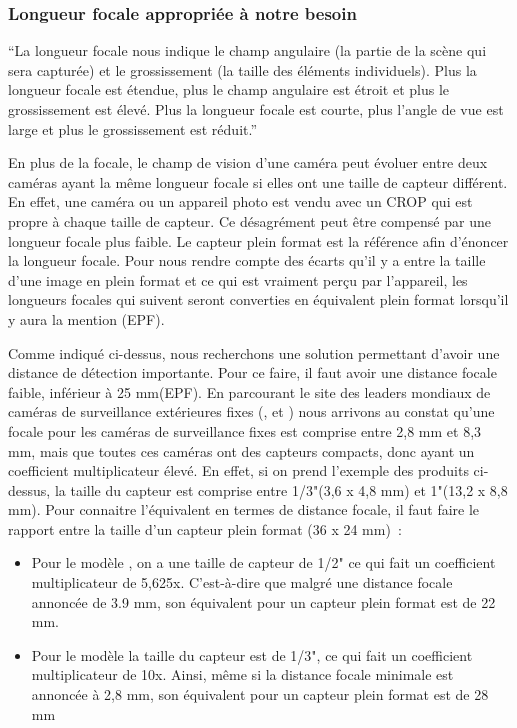 \subsubsection{Longueur focale appropriée à notre besoin}
\label{sec:camera_focale}

\enquote{La longueur focale nous indique le champ angulaire (la partie de la scène qui sera capturée)
    et le grossissement (la taille des éléments individuels).
    Plus la longueur focale est étendue, plus le champ angulaire est étroit et plus le grossissement est élevé.
    Plus la longueur focale est courte, plus l’angle de vue est large et plus le grossissement est réduit.} \cite{focale}

En plus de la focale, le champ de vision d'une caméra peut évoluer entre deux caméras ayant la même longueur focale
si elles ont une taille de capteur différent.
En effet, une caméra ou un appareil photo est vendu avec un \gls{CROP} qui est propre à chaque taille de capteur.
Ce désagrément peut être compensé par une longueur focale plus faible.
Le capteur plein format est la référence afin d'énoncer la longueur focale.
Pour nous rendre compte des écarts qu'il y a entre la taille d'une image en plein format et ce qui est vraiment perçu par l'appareil,
les longueurs focales qui suivent seront converties en équivalent plein format lorsqu'il y aura la mention (EPF).

Comme indiqué ci-dessus, nous recherchons une solution permettant d'avoir une distance de détection importante.
Pour ce faire, il faut avoir une distance focale faible, inférieur à 25 mm(EPF).
En parcourant le site des leaders mondiaux de caméras de surveillance extérieures fixes
(\cite[pelco]{Pelco}, \cite[axis]{Axisr} et \cite[panasonic]{Panasonic})
nous arrivons au constat qu'une focale pour les caméras de surveillance fixes est comprise entre 2,8 mm et 8,3 mm, mais que toutes ces caméras ont des capteurs compacts, donc ayant un coefficient multiplicateur élevé.
En effet, si on prend l'exemple des produits ci-dessus, la taille du capteur est comprise entre 1/3"(3,6 x 4,8 mm) et 1"(13,2 x 8,8 mm).
Pour connaitre l'équivalent en termes de distance focale, il faut faire le rapport entre la taille d'un capteur plein format (36 x 24 mm) :
\begin{itemize}
    \item Pour le modèle \cite[Axis Q1645]{AxisQ1645}, on a une taille de capteur de 1/2"
          ce qui fait un coefficient multiplicateur de 5,625x. C'est-à-dire que malgré une distance focale annoncée de 3.9 mm, son équivalent pour un capteur plein format est de 22 mm.
    \item Pour le modèle \cite[Panasonic i-Pro Extreme WV-S1531LN - network surveillance camera]{panaIPro}
          la taille du capteur est de 1/3", ce qui fait un coefficient multiplicateur de 10x. Ainsi, même si la distance focale minimale est annoncée à 2,8 mm, son équivalent pour un capteur plein format est de 28 mm
\end{itemize}

